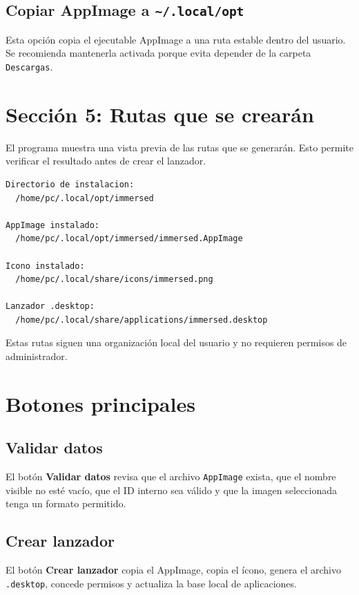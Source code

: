 \documentclass[11pt,a4paper]{article}
\begin{document}
\subsection{Copiar AppImage a \texttt{\~{}/.local/opt}}

Esta opción copia el ejecutable AppImage a una ruta estable dentro del usuario. Se recomienda mantenerla activada porque evita depender de la carpeta \texttt{Descargas}.

\section{Sección 5: Rutas que se crearán}

El programa muestra una vista previa de las rutas que se generarán. Esto permite verificar el resultado antes de crear el lanzador.

\begin{lstlisting}[style=textstyle]
Directorio de instalacion:
  /home/pc/.local/opt/immersed

AppImage instalado:
  /home/pc/.local/opt/immersed/immersed.AppImage

Icono instalado:
  /home/pc/.local/share/icons/immersed.png

Lanzador .desktop:
  /home/pc/.local/share/applications/immersed.desktop
\end{lstlisting}

Estas rutas siguen una organización local del usuario y no requieren permisos de administrador.

\section{Botones principales}

\subsection{Validar datos}

El botón \textbf{Validar datos} revisa que el archivo \texttt{AppImage} exista, que el nombre visible no esté vacío, que el ID interno sea válido y que la imagen seleccionada tenga un formato permitido.

\subsection{Crear lanzador}

El botón \textbf{Crear lanzador} copia el AppImage, copia el ícono, genera el archivo \texttt{.desktop}, concede permisos y actualiza la base local de aplicaciones.
\end{document}
